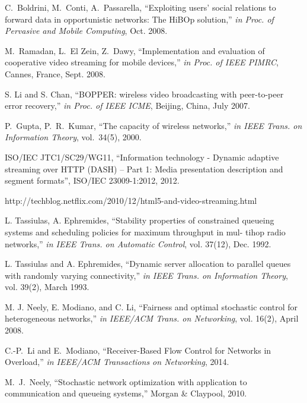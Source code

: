 \documentclass[conference]{IEEEtran}
\begin{document}
\begin{thebibliography}{}
 C.~Boldrini, M.~Conti, A.~Passarella, ``Exploiting users' social relations to forward data in opportunistic networks: The HiBOp solution,'' {\em in Proc. of Pervasive and Mobile Computing}, Oct. 2008.


 M.~Ramadan, L.~El Zein, Z.~Dawy, ``Implementation and evaluation of cooperative video streaming for mobile devices,'' {\em in Proc. of IEEE PIMRC}, Cannes, France, Sept. 2008.

 S. Li and S. Chan, ``BOPPER: wireless video broadcasting with peer-to-peer error recovery,'' {\em in Proc. of IEEE ICME}, Beijing, China, July 2007.












 P.~Gupta, P.~R.~Kumar, ``The capacity of wireless networks,'' \emph{in IEEE Trans. on Information Theory}, vol.~34(5), 2000.

 ISO/IEC JTC1/SC29/WG11, ``Information technology - Dynamic adaptive streaming over HTTP (DASH) -- Part 1: Media presentation description and segment formats'', ISO/IEC 23009-1:2012, 2012.

 http://techblog.netflix.com/2010/12/html5-and-video-streaming.html

 L. Tassiulas, A. Ephremides, ``Stability properties of constrained queueing systems and scheduling policies for maximum throughput in mul- tihop radio networks,'' {\em in IEEE Trans. on Automatic Control}, vol. 37(12), Dec. 1992.

 L. Tassiulas and A. Ephremides, ``Dynamic server allocation to parallel queues with randomly varying connectivity,'' {\em in IEEE Trans. on Information Theory}, vol. 39(2), March 1993.

 M. J. Neely, E. Modiano, and C. Li, ``Fairness and optimal stochastic control for heterogeneous networks,'' {\em in IEEE/ACM Trans. on Networking}, vol. 16(2), April 2008.

 C.-P.~Li and E.~Modiano, ``Receiver-Based Flow Control for Networks in Overload,'' {\em in IEEE/ACM Transactions on Networking}, 2014.

 M.~J.~Neely, ``Stochastic network optimization with application to communication and queueing systems,'' Morgan \& Claypool, 2010.


\end{thebibliography}
\end{document}
